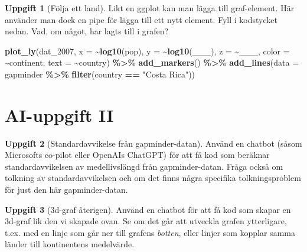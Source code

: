 \documentclass[
]{book}
\newenvironment{Shaded}{\begin{snugshade}}{\end{snugshade}}
\newcommand{\AttributeTok}[1]{\textcolor[rgb]{0.13,0.29,0.53}{#1}}
\newcommand{\FunctionTok}[1]{\textcolor[rgb]{0.13,0.29,0.53}{\textbf{#1}}}
\newcommand{\NormalTok}[1]{#1}
\newcommand{\SpecialCharTok}[1]{\textcolor[rgb]{0.81,0.36,0.00}{\textbf{#1}}}
\newcommand{\StringTok}[1]{\textcolor[rgb]{0.31,0.60,0.02}{#1}}
\theoremstyle{definition}
\theoremstyle{definition}
\theoremstyle{definition}
\newtheorem{exercise}{Uppgift}[chapter]
\theoremstyle{definition}
\theoremstyle{remark}
\begin{document}
\begin{exercise}[Följa ett land]

Likt en ggplot kan man lägga till graf-element. Här använder man dock en pipe för lägga till ett nytt element. Fyll i kodstycket nedan. Vad, om något, har lagts till i grafen?

\begin{Shaded}
\begin{Highlighting}[]
\FunctionTok{plot\_ly}\NormalTok{(dat\_2007, }\AttributeTok{x =} \SpecialCharTok{\textasciitilde{}}\FunctionTok{log10}\NormalTok{(pop), }\AttributeTok{y =} \SpecialCharTok{\textasciitilde{}}\FunctionTok{log10}\NormalTok{(\_\_\_), }
        \AttributeTok{z =} \SpecialCharTok{\textasciitilde{}}\NormalTok{\_\_\_, }\AttributeTok{color =} \SpecialCharTok{\textasciitilde{}}\NormalTok{continent, }\AttributeTok{text =} \SpecialCharTok{\textasciitilde{}}\NormalTok{country) }\SpecialCharTok{\%\textgreater{}\%} 
  \FunctionTok{add\_markers}\NormalTok{() }\SpecialCharTok{\%\textgreater{}\%} 
  \FunctionTok{add\_lines}\NormalTok{(}\AttributeTok{data =}\NormalTok{ gapminder }\SpecialCharTok{\%\textgreater{}\%} \FunctionTok{filter}\NormalTok{(country }\SpecialCharTok{==} \StringTok{"Costa Rica"}\NormalTok{))}
\end{Highlighting}
\end{Shaded}

\end{exercise}

\section{AI-uppgift II}\label{ai-uppgift-ii}

\begin{exercise}[Standardavvikelse från gapminder-datan]
Använd en chatbot (såsom Microsofts co-pilot eller OpenAIs ChatGPT) för att få kod som beräknar standardavvikelsen av medellivslängd från gapminder-datan. Fråga också om tolkning av standardavvikelsen och om det finns några specifika tolkningsproblem för just den här gapminder-datan.
\end{exercise}

\begin{exercise}[3d-graf återigen]
Använd en chatbot för att få kod som skapar en 3d-graf lik den vi skapade ovan. Se om det går att utveckla grafen ytterligare, t.ex. med en linje som går ner till grafens \emph{botten}, eller linjer som kopplar samma länder till kontinentens medelvärde.
\end{exercise}
\end{document}
